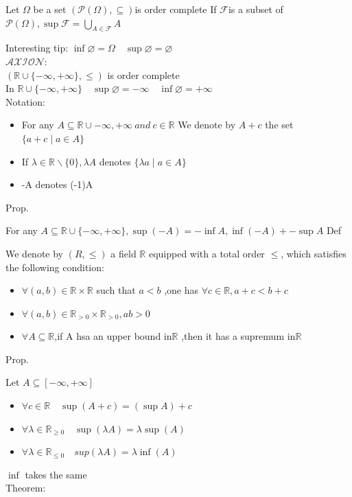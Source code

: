 \documentclass{book}
\begin{document}
Let $\Omega$ be a set $(\mathscr{P}(\Omega),\subseteq)$is order complete If $\mathscr{F}$is a subset of $\mathscr{P}(\Omega),\sup\mathscr{F}=\bigcup\limits_{A\in \mathscr{F}}A$

Interesting tip: $\inf \varnothing =\Omega\quad \sup \varnothing=\varnothing$\\
$\mathcal{AXION}:$\\\indent$(\mathbb{R}\cup\{-\infty,+\infty\},\leq)$ is order complete \\\indent In $\mathbb{R}\cup\{-\infty,+\infty\}\quad \sup\varnothing=-\infty\quad\inf\varnothing=+\infty$\\
Notation:
\begin{itemize}
    \item For any $A\subseteq \mathbb{R} \cup{-\infty,+\infty}\ and\ c\in \mathbb{R} $ We denote by $A+c$ the set $\{a+c\mid a\in A\}$
    \item If $\lambda\in\mathbb{R} \backslash\{0\},\lambda A$ denotes $\{\lambda a\mid a\in A\}$
    \item -A denotes (-1)A
\end{itemize}
Prop.

For any $A\subseteq\mathbb{R} \cup\{-\infty,+\infty\},\sup(-A)=-\inf A,\inf (-A)+-\sup A$
Def 

We denote by $(R,\leq)$ a field $\mathbb{R} $ equipped with a total order $\leq$, which satisfies the following condition:
\begin{itemize}
    \item $\forall (a,b)\in \mathbb{R} \times \mathbb{R} $ such that $a<b$ ,one has $\forall c\in \mathbb{R} ,a+c<b+c$
    \item $\forall(a,b)\in\mathbb{R}_{>0}\times\mathbb{R}_{>0},ab>0$
    \item $\forall A\subseteq \mathbb{R} $,if A hsa an upper bound in$\mathbb{R}$ ,then it has a supremum in$\mathbb{R} $
\end{itemize}
Prop.

Let $A\subseteq[-\infty,+\infty]$
\begin{itemize}
    \item $\forall c\in \mathbb{R} \quad \sup(A+c)=(\sup A)+c$
    \item $\forall \lambda\in \mathbb{R}_{\geq0}\quad \sup(\lambda A)=\lambda\sup(A)$
    \item $\forall\lambda\in \mathbb{R} _{\leq0}\quad sup(\lambda A)=\lambda\inf(A)$
\end{itemize}

\indent $\inf$ takes the same\\
Theorem:
\end{document}
